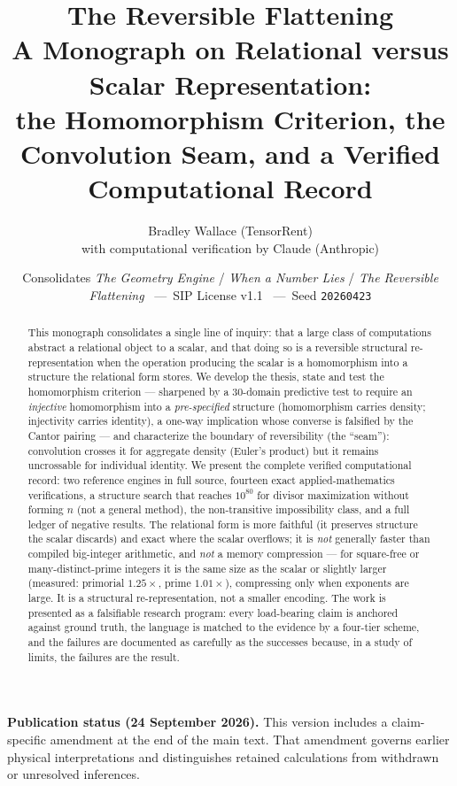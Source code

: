 \documentclass[11pt]{article}
\title{\textbf{The Reversible Flattening}\\[6pt]
\large A Monograph on Relational versus Scalar Representation:\\
the Homomorphism Criterion, the Convolution Seam, and a Verified Computational Record}
\author{Bradley Wallace \quad (TensorRent)\\
\small with computational verification by Claude (Anthropic)}
\date{\small Consolidates \textit{The Geometry Engine} / \textit{When a Number Lies} / \textit{The Reversible Flattening} \ ---\ SIP License v1.1 \ ---\ Seed \texttt{20260423}}
\begin{document}
\maketitle
\begin{abstract}
\noindent This monograph consolidates a single line of inquiry: that a large class of computations abstract a
relational object to a scalar, and that doing so is a reversible structural re-representation when the operation
producing the scalar is a homomorphism into a structure the relational form stores. We develop the thesis,
state and test the homomorphism criterion --- sharpened by a $30$-domain predictive test to require an
\emph{injective} homomorphism into a \emph{pre-specified} structure (homomorphism carries density; injectivity carries identity), a one-way implication whose converse is falsified by the Cantor pairing --- and characterize the boundary of reversibility (the
``seam''): convolution crosses it for aggregate density (Euler's product) but it remains uncrossable for
individual identity. We present the complete verified computational record: two reference engines in
full source, fourteen exact applied-mathematics verifications, a structure search that reaches
$10^{80}$ for divisor maximization without forming $n$ (not a general method), the non-transitive
impossibility class, and a full ledger of negative results. The relational form is more faithful (it
preserves structure the scalar discards) and exact where the scalar overflows; it is \emph{not} generally
faster than compiled big-integer arithmetic, and \emph{not} a memory compression --- for square-free or
many-distinct-prime integers it is the same size as the scalar or slightly larger (measured: primorial
$1.25\times$, prime $1.01\times$), compressing only when exponents are large. It is a structural
re-representation, not a smaller encoding. The work is
presented as a falsifiable research program: every load-bearing claim is anchored against ground truth, the
language is matched to the evidence by a four-tier scheme, and the failures are documented as carefully as
the successes because, in a study of limits, the failures are the result.
\end{abstract}
\par\smallskip\noindent\textbf{Publication status (24 September 2026).}
This version includes a claim-specific amendment at the end of the main text.
That amendment governs earlier physical interpretations and distinguishes
retained calculations from withdrawn or unresolved inferences.\par\smallskip
\end{document}

